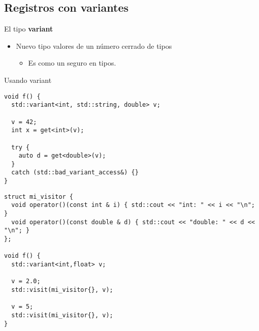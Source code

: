 \subsection{Registros con variantes}

\begin{frame}[t,fragile]{El tipo \textbf{variant}}
\begin{itemize}
  \item Nuevo tipo  valores de un número cerrado de tipos
    \begin{itemize}
      \item Es como un  seguro en tipos.
    \end{itemize}
\end{itemize}
\begin{block}{Usando variant}
\begin{lstlisting}
void f() {
  std::variant<int, std::string, double> v;

  v = 42;
  int x = get<int>(v);

  try {
    auto d = get<double>(v);
  }
  catch (std::bad_variant_access&) {}
}
\end{lstlisting}
\end{block}
\end{frame}

\begin{frame}[t,fragile]{}
\begin{lstlisting}
struct mi_visitor {
  void operator()(const int & i) { std::cout << "int: " << i << "\n"; }
  void operator()(const double & d) { std::cout << "double: " << d << "\n"; }
};

void f() {
  std::variant<int,float> v;

  v = 2.0;
  std::visit(mi_visitor{}, v);

  v = 5;
  std::visit(mi_visitor{}, v);
}
\end{lstlisting}
\end{frame}

